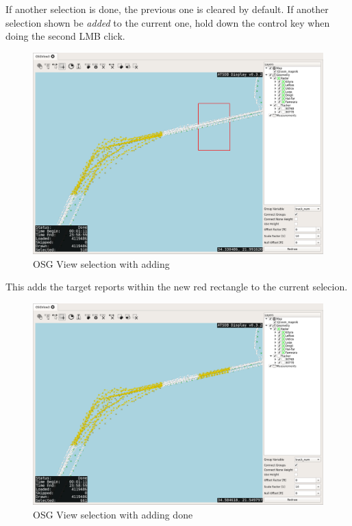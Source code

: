 {If another selection is done, the previous one is cleared by default. If another selection shown be \textit{added} to the current one, hold down the control key when doing the second LMB click.

\begin{figure}[H]
    \hspace*{-2cm}
    \includegraphics[width=18cm,frame]{../screenshots/osgview_select_add1.png}
  \caption{OSG View selection with adding}
\end{figure}

This adds the target reports within the new red rectangle to the current selecion.

\begin{figure}[H]
    \hspace*{-2cm}
    \includegraphics[width=18cm,frame]{../screenshots/osgview_select_add2.png}
  \caption{OSG View selection with adding done}
\end{figure}

}
